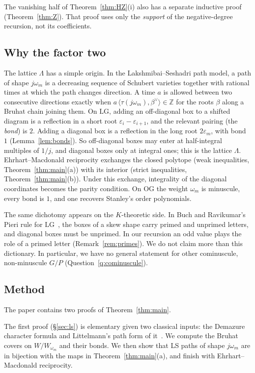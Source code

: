 \documentclass[11pt]{amsart}
\theoremstyle{definition}
\theoremstyle{remark}
\newcommand{\LG}{\mathrm{LG}}
\newcommand{\OG}{\mathrm{OG}}
\newcommand{\Z}{\mathbb{Z}}
\begin{document}
The vanishing half of Theorem~\ref{thm:HZ}(i) also has a separate inductive proof
(Theorem~\ref{thm:Z}). That proof uses only the \emph{support} of the negative-degree
recursion, not its coefficients.

\subsection{Why the factor two}\label{ssec:why}
The lattice $\Lambda$ has a simple origin. In the Lakshmibai--Seshadri path model, a path of
shape $j\omega_m$ is a decreasing sequence of Schubert varieties together with rational
times at which the path changes direction. A time $a$ is allowed between two consecutive
directions exactly when $a\,\langle\tau(j\omega_m),\beta^\vee\rangle\in\Z$ for the roots
$\beta$ along a Bruhat chain joining them. On $\LG$, adding an off-diagonal box to a
shifted diagram is a reflection in a short root $\varepsilon_i-\varepsilon_{i+1}$, and the
relevant pairing (the \emph{bond}) is $2$. Adding a diagonal box is a reflection in the long
root $2\varepsilon_m$, with bond $1$ (Lemma~\ref{lem:bonds}). So off-diagonal boxes may enter
at half-integral multiples of $1/j$, and diagonal boxes only at integral ones; this is the
lattice $\Lambda$. Ehrhart--Macdonald reciprocity exchanges the closed polytope (weak
inequalities, Theorem~\ref{thm:main}(a)) with its interior (strict inequalities,
Theorem~\ref{thm:main}(b)). Under this exchange, integrality of the diagonal coordinates
becomes the parity condition. On $\OG$ the weight $\omega_m$ is minuscule, every bond is
$1$, and one recovers Stanley's order polynomials.

The same dichotomy appears on the $K$-theoretic side. In Buch and Ravikumar's Pieri rule for
$\LG$~\cite{BR12}, the boxes of a skew shape carry primed and unprimed letters, and diagonal
boxes must be unprimed. In our recursion an odd value plays the role of a primed letter
(Remark~\ref{rem:primes}). We do not claim more than this dictionary. In particular, we have
no general statement for other cominuscule, non-minuscule $G/P$ (Question~\ref{q:cominuscule}).

\subsection{Method}
The paper contains two proofs of Theorem~\ref{thm:main}.

The first proof (\S\ref{sec:ls}) is elementary given two classical inputs: the Demazure
character formula and Littelmann's path form of it~\cite{Lit94,LitICM}. We compute the
Bruhat covers on $W/W_{\omega_m}$ and their bonds. We then show that LS paths of shape
$j\omega_m$ are in bijection with the maps in Theorem~\ref{thm:main}(a), and finish with
Ehrhart--Macdonald reciprocity.
\end{document}
